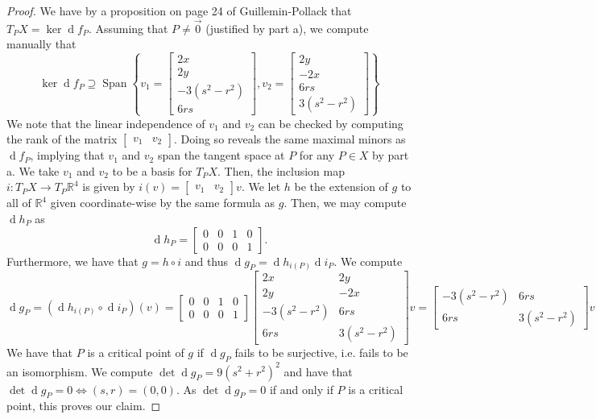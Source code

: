 \documentclass[english]{article}
\let\avec=\vec
\renewcommand\vec{\mathbf}
\renewcommand{\d}[1]{\ensuremath{\operatorname{d}\!{#1}}}
\newcommand{\RR}{\mathbb{R}}
\newcommand{\prob}[1]{\setcounter{section}{#1-1}\section{}}
\newcommand{\prt}[1]{\setcounter{subsection}{#1-1}\subsection{}}
\theoremstyle{remark}
\theoremstyle{definition}
\DeclareMathOperator{\spn}{Span}
\begin{document}
\begin{proof}
	We have by a proposition on page 24 of Guillemin-Pollack that $T_PX=\ker \d f_P$. Assuming that $P\neq \avec{0}$ (justified by part a), we compute manually that 
	\[\ker \d f_P\supseteq \spn\left\{v_1=\begin{bmatrix}
	2x\\2y\\-3(s^2-r^2)\\6rs
	\end{bmatrix},v_2=\begin{bmatrix}
	2y\\-2x\\6rs\\3(s^2-r^2)
	\end{bmatrix}\right\}\]
	We note that the linear independence of $v_1$ and $v_2$ can be checked by computing the rank of the matrix $\begin{bmatrix} v_1&v_2\end{bmatrix}$. Doing so reveals the same maximal minors as $\d f_P$, implying that $v_1$ and $v_2$ span the tangent space at $P$ for any $P\in X$ by part a. We take $v_1$ and $v_2$ to be a basis for $T_PX$. Then, the inclusion map $i:T_PX\to T_P\RR^4$ is given by $i(v)=\begin{bmatrix}
	v_1&v_2
	\end{bmatrix}v$. We let $h$ be the extension of $g$ to all of $\RR^4$ given coordinate-wise by the same formula as $g$. Then, we may compute $\d h_P$ as \[\d h_P=\begin{bmatrix}
	0&0&1&0\\0&0&0&1
	\end{bmatrix}. \] Furthermore, we have that $g=h\circ i$ and thus $\d g_P=\d h_{i(P)}\d i_P$. We compute \[\d g_P=(\d h_{i(P)}\circ\d i_P)(v)=\begin{bmatrix}
	0&0&1&0\\0&0&0&1
	\end{bmatrix}\begin{bmatrix}
	2x&2y\\2y&-2x\\-3(s^2-r^2)&6rs\\6rs&3(s^2-r^2)
	\end{bmatrix}v=\begin{bmatrix}
	-3(s^2-r^2)&6rs\\6rs&3(s^2-r^2)
	\end{bmatrix}v \]
	We have that $P$ is a critical point of $g$ if $\d g_P$ fails to be surjective, i.e. fails to be an isomorphism. We compute $\det \d g_P=9(s^2+r^2)^2$ and have that $\det \d g_P=0\iff (s,r)=(0,0)$. As $\det \d g_P=0$ if and only if $P$ is a critical point, this proves our claim.
\end{proof}
\prob{3}
\prob{4}
\prt{1}
\prt{2}
\prob{5}
\end{document}
